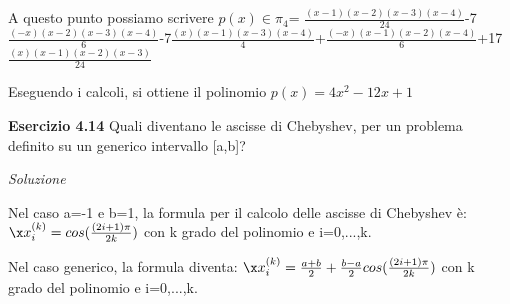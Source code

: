 \documentclass[20pt,a4paper]{book}
\begin{document}
A questo punto possiamo scrivere \begin{math} p(x)\in\pi_{4} \end{math}= \begin{math}\frac{(x-1)(x-2)(x-3)(x-4)}{24}\end{math}-7\begin{math}\frac{(-x)(x-2)(x-3)(x-4)}{6}\end{math}-7\begin{math}\frac{(x)(x-1)(x-3)(x-4)}{4}\end{math}+\begin{math}\frac{(-x)(x-1)(x-2)(x-4)}{6}\end{math}+17\begin{math}\frac{(x)(x-1)(x-2)(x-3)}{24}\end{math}

\vspace{2mm}
Eseguendo i calcoli, si ottiene il polinomio \begin{math}p(x)=4x^{2}-12x+1\end{math}

\vspace{10mm}


\textbf{\Large{Esercizio 4.14}}
Quali diventano le ascisse di Chebyshev, per un problema definito su un generico intervallo [a,b]?

\textit{Soluzione}

Nel caso a=-1 e b=1, la formula per il calcolo delle ascisse di Chebyshev è:
\begin{math}\x x_{i}^{(k)}=cos(\frac{(2i+1)\pi}{2k})\end{math}  con k grado del polinomio e i=0,...,k.

Nel caso generico, la formula diventa:
\begin{math}\x x_{i}^{(k)}=\frac{a+b}{2}+\frac{b-a}{2}cos(\frac{(2i+1)\pi}{2k})\end{math}  con k grado del polinomio e i=0,...,k.



\vspace{10mm}
\end{document}
